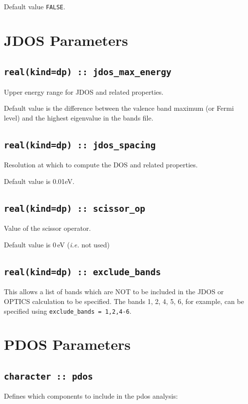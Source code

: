 \documentclass[a4paper,11pt,twoside]{book}
\begin{document}
{Default value \verb#FALSE#.



\section{JDOS Parameters}

\subsection[jdos\_max\_energy]{\tt real(kind=dp) :: jdos\_max\_energy}
Upper energy range for JDOS and related properties.

Default value is the difference between the valence band maximum (or
Fermi level) and the highest eigenvalue in the bands file.

\subsection[jdos\_spacing]{\tt real(kind=dp) :: jdos\_spacing} 
Resolution at which to compute the DOS and related properties.

Default value is 0.01eV. 

\subsection[scissor\_op]{\tt real(kind=dp) :: scissor\_op}
Value of the scissor operator. 

Default value is 0\,eV (\emph{i.e.} not used)

\subsection[exclude\_bands]{\tt real(kind=dp) :: exclude\_bands}
This allows a list of bands which are NOT to be included in the JDOS or OPTICS calculation to be specified.  The bands 1, 2, 4, 5, 6, for example, can be specified using \verb#exclude_bands = 1,2,4-6#. 

\section{PDOS Parameters}

\subsection[pdos]{\tt character :: pdos}
Defines which components to include in the pdos analysis:

}
\end{document}
